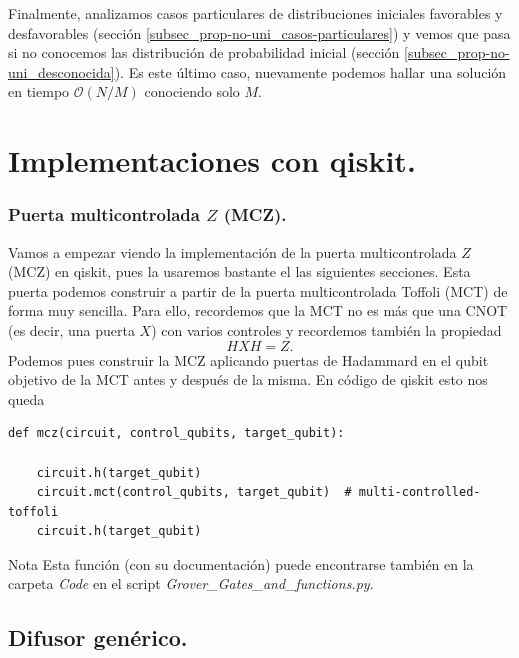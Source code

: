 \documentclass[a4paper,11pt]{article} %
\numberwithin{equation}{section}
\begin{document}
Finalmente, analizamos casos particulares de distribuciones iniciales favorables y desfavorables (sección \ref{subsec_prop-no-uni_casos-particulares}) y vemos que pasa si no conocemos las distribución de probabilidad inicial (sección \ref{subsec_prop-no-uni_desconocida}). Es este último caso, 
nuevamente podemos hallar una solución en tiempo $\mathcal{O}(N/M)$ conociendo solo $M$. 








\newpage
\section{Implementaciones con qiskit.}

\subsubsection{Puerta multicontrolada $Z$ (MCZ).}

Vamos a empezar viendo la implementación de la puerta multicontrolada $Z$ (MCZ) en qiskit, pues la usaremos bastante el las siguientes secciones. Esta puerta podemos construir a partir de la puerta multicontrolada Toffoli (MCT) de forma muy sencilla. Para ello, recordemos que la MCT no es más que una CNOT (es decir, una puerta $X$) con varios controles y recordemos también la propiedad
\begin{equation} \label{Imple_HXH_Z}
HXH = Z .
\end{equation}
Podemos pues construir la MCZ aplicando puertas de Hadammard en el qubit objetivo de la MCT antes y después de la misma. En código de qiskit esto nos queda 

\begin{lstlisting}
def mcz(circuit, control_qubits, target_qubit):

	circuit.h(target_qubit)
	circuit.mct(control_qubits, target_qubit)  # multi-controlled-toffoli
	circuit.h(target_qubit)

\end{lstlisting}

	\begin{mybox}{Nota}
	Esta función (con su documentación) puede encontrarse también en la carpeta \textit{Code} en el script
	\textit{Grover\_Gates\_and\_functions.py}.
	\end{mybox}


\subsection{Difusor genérico.}
\end{document}

